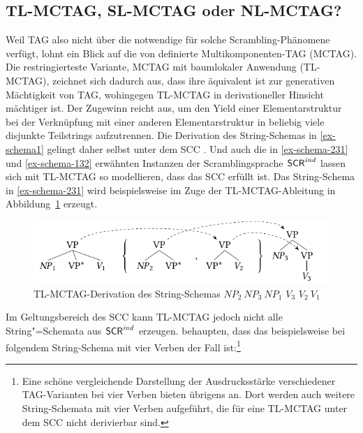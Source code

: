 \subsection{TL-MCTAG, SL-MCTAG oder NL-MCTAG?}

Weil TAG also nicht über die notwendige  für solche Scrambling-Phänomene verfügt, lohnt ein Blick auf die von \cite{Weir:88} definierte Multikomponenten-TAG (MCTAG). Die restringierteste Variante, MCTAG mit baumlokaler Anwendung (TL-MCTAG), zeichnet sich dadurch aus, dass ihre  äquivalent ist zur generativen Mächtigkeit von TAG, wohingegen TL-MCTAG in derivationeller Hinsicht mächtiger ist. Der Zugewinn reicht aus, um den Yield einer Elementarstruktur bei der Verknüpfung mit einer anderen Elementarstruktur in beliebig viele disjunkte Teilstrings aufzutrennen. Die Derivation des String-Schemas in \ref{ex-schema1} gelingt daher selbst unter dem SCC \citep[Abbildung~6]{Joshi:Becker:Rambow:00}. Und auch die in \ref{ex-schema-231} und \ref{ex-schema-132} erwähnten Instanzen der Scramblingsprache $\mathsf{SCR}^{\mathit{ind}}$ lassen sich mit TL-MCTAG so modellieren, dass das SCC erfüllt ist. Das String-Schema in \ref{ex-schema-231} wird beispielsweise im Zuge der TL-MCTAG-Ableitung in Abbildung~\ref{fig-schema-231} erzeugt. 
\begin{figure}[t]
\centering
\includegraphics{graphics/abb515.pdf}
\caption{\label{fig-schema-231}TL-MCTAG-Derivation des String-Schemas $\mathit{NP}_2 ~ \mathit{NP}_3 ~ \mathit{NP}_1 $ $V_3$ $V_2 ~ V_1$}
\end{figure}

Im Geltungsbereich des SCC kann TL-MCTAG jedoch nicht alle String"=Schemata aus $\mathsf{SCR}^{\mathit{ind}}$ erzeugen. \citet[175]{Joshi:Becker:Rambow:00} behaupten, dass das beispielsweise bei folgendem String-Schema mit vier Verben der Fall ist:\footnote{Eine schöne vergleichende Darstellung der Ausdrucksstärke verschiedener TAG-Varianten bei vier Verben bieten übrigens \citet[Abbildung 3, Abbildung 7]{Chen-Main:Joshi:08} an. Dort werden auch weitere String-Schemata mit vier Verben aufgeführt, die für eine TL-MCTAG unter dem SCC nicht derivierbar sind.}

